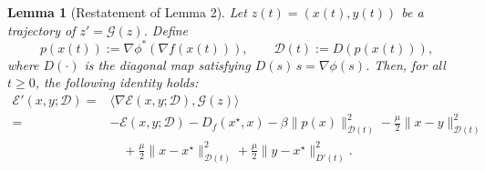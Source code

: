\documentclass{article}
\theoremstyle{plain}
\newtheorem{lemma}{Lemma}
\newtheorem*{lemma*}{Lemma}
\theoremstyle{remark}
\begin{document}



\begin{lemma*}[Restatement of Lemma 2]
Let $z(t)=(x(t),y(t))$ be a trajectory of $z'=\mathcal{G}(z)$. Define
$$
p(x(t)):=\nabla\phi^*(\nabla f(x(t))),\qquad \mathcal D(t):=D(p(x(t))),
$$
where $D(\cdot)$ is the diagonal map satisfying $D(s)\,s=\nabla\phi(s)$. Then, for all $t\ge 0$, the following identity holds:
$$
\begin{aligned}
\mathcal{E}'(x,y;\mathcal D)={}&\langle \nabla \mathcal{E}(x,y;\mathcal D),\mathcal{G}(z)\rangle\\
={}& -\mathcal{E}(x,y;\mathcal D) - D_f(x^\star,x) -\beta\|p(x)\|_{\mathcal D(t)}^2 -\frac{\mu}{2}\|x-y\|_{\mathcal D(t)}^2
\\
&\quad + \frac{\mu}{2}\|x-x^\star\|_{\mathcal D(t)}^2+\frac{\mu}{2}\|y-x^\star\|_{D'(t)}^2.
\end{aligned}
$$
\end{lemma*}
\end{document}
